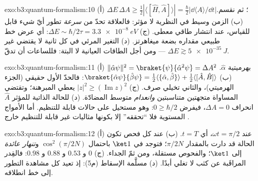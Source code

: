 \begin{solution}{exo:b3:quantum-formalism:10}
(أ) $\Delta E\,\Delta A \ge \tfrac12|\langle[\hat H, \hat
A]\rangle| = \tfrac\hbar2|\dd\langle A\rangle/\dd t|$؛ ثم نقسم. (ب)
الزمن وسيط في النظرية لا مؤثر: فالعلاقة
تحدّ من \emph{سرعة} تطور أيّ شيء قابل للقياس، عند
انتشار طاقي معطى. (ج) $\Delta E \sim \hbar/2\tau = \qty{3.3e-8}{eV}$:
أي عرض خط طبيعي مقداره بضعة ميغاهرتز. (د) التغير المرئي في كل
ثانية لا يقتضي غير $\Delta E \gtrsim \qty{5e-35}{J}$ --- ومن أجل
الطاقات العيانية لا  البتة: فللساعات أن تدقّ.
\end{solution}

\begin{solution}{exo:b3:quantum-formalism:11}
(أ) $\|\hat\alpha\psi\|^2 = \braket{\psi}{\hat\alpha^2\psi} =
\Delta A^2$ بهرميتية $\hat\alpha$. (ب) $\braket{\hat\alpha
\psi}{\hat\beta\psi} = \tfrac12\langle\{\hat\alpha,
\hat\beta\}\rangle + \tfrac12\langle[\hat A, \hat B]\rangle$: فالحدّ
الأول حقيقي (الجزء الهرميتي)، والثاني تخيلي صرف.
(ج) $|z|^2 \ge (\operatorname{Im}z)^2$ يعطي المبرهنة؛ وتقتضي المساواة
متجهتين متناسبتين \emph{وانعدام} متوسط 
المضادّة. (د) للحالة الذاتية للمؤثر $\hat A$ انحراف $\Delta A = 0$، فيفرض
$0 \ge \hbar/2$: وهو مستحيل على حالات قابلة للتنظيم. أما الأمواج المستوية
فلا ``تحققه'' إلا بكونها مثاليات غير قابلة للتنظيم خارج
.
\end{solution}

\begin{solution}{exo:b3:quantum-formalism:12}
(أ) عند $\omega t = \pi/2$، أي $t = T$. (ب) عند كل فحص تكون
الحالة قد دارت بالمقدار $\pi/2N$؛ فتوجد في $\ket1$ باحتمال
$\cos^2(\pi/2N)$ و\emph{تنهار عائدة} إلى $\ket1$؛ والفحوص
مستقلة، ومن ثمّ الجداء. (ج) $0$ و $0.53$ و $0.88$ و $0.98$:
فالقِدر المراقَبة عن كثب لا تغلي أبدًا. (د) مسلَّمة الإسقاط
(م5): إذ تعيد كل مشاهدة التطور إلى خط انطلاقه.
\end{solution}

